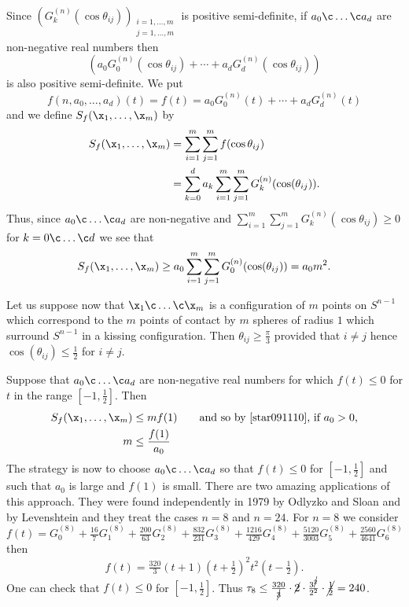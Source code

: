 Since $(G_k^{(n)}(\cos\theta_{ij}))_{\substack{i=1,\dotsc,m\\j=1,\dotsc,m}}$ is positive semi-definite, if $a_0\c \dotsc\c a_d$ are non-negative real numbers then
\[ (a_0G_0^{(n)}(\cos\theta_{ij})+\dotsb+a_dG_d^{(n)}(\cos\theta_{ij})) \]
is also positive semi-definite.  We put
\[ f(n,a_0,\dotsc,a_d)(t) = f(t) = a_0G_0^{(n)}(t) + \dotsb + a_dG_d^{(n)}(t) \]
and we define $S_f(\x_1,\dotsc,\x_m)$ by
\begin{align*}
S_f(\x_1,\dotsc,\x_m) &= \sum_{i=1}^m\sum_{j=1}^m f(\cos\theta_{ij}) \\
&= \sum_{k=0}^d a_k \sum_{i=1}^m\sum_{j=1}^m G_k^{(n)}(\cos(\theta_{ij})) .
\end{align*}
Thus, since $a_0\c \dotsc\c a_d$ are non-negative and $\sum_{i=1}^m\sum_{j=1}^m G_k^{(n)}(\cos\theta_{ij})\geq0$ for $k=0\c \dotsc\c d$ we see that
\begin{equation} S_f(\x_1,\dotsc,\x_m) \geq a_0 \sum_{i=1}^m\sum_{j=1}^m G_0^{(n)}(\cos(\theta_{ij})) = a_0 m^2 \label{star091110} . \end{equation}

Let us suppose now that $\x_1\c \dotsc\c \x_m$ is a configuration of $m$ points on $S^{n-1}$ which correspond to the $m$ points of contact by $m$ spheres of radius $1$ which surround $S^{n-1}$ in a kissing configuration.  Then $\theta_{ij}\geq\frac\pi3$ provided that $i\neq j$ hence $\cos(\theta_{ij})\leq\frac12$ for $i\neq j$.

Suppose that $a_0\c \dotsc\c a_d$ are non-negative real numbers for which $f(t)\leq0$ for $t$ in the range $[-1,\frac12]$.  Then
\begin{align*}
S_f(\x_1,\dotsc,\x_m) &\leq m f(1) \qquad\text{and so by~\eqref{star091110}, if $a_0>0$,} \\
m &\leq \frac{f(1)}{a_0}
\end{align*}%
The strategy is now to choose $a_0\c \dotsc\c a_d$ so that $f(t)\leq0$ for $[-1,\frac12]$ and such that $a_0$ is large and $f(1)$ is small.  There are two amazing applications of this approach.  They were found independently in 1979 by Odlyzko and Sloan and by Levenshtein and they treat the cases $n=8$ and $n=24$. %
For $n=8$ we consider
\[ f(t) = G_0^{(8)} + \tfrac{16}{7}G_1^{(8)} + \tfrac{200}{63}G_2^{(8)} + \tfrac{832}{231}G_3^{(8)} + \tfrac{1216}{429}G_4^{(8)} + \tfrac{5120}{3003}G_5^{(8)} + \tfrac{2560}{4641}G_6^{(8)} \]
then
\[ f(t) = \tfrac{320}{3}(t+1)(t+\tfrac12)^2t^2(t-\tfrac12) . \]
One can check that $f(t)\leq0$ for $[-1,\frac12]$.  Thus $\tau_8\leq\frac{320}{\cancel3}\cdot\cancel2\cdot\frac{3^{\cancel2}}{2^2}\cdot\cancel{\frac{1}{2}}=240$.

